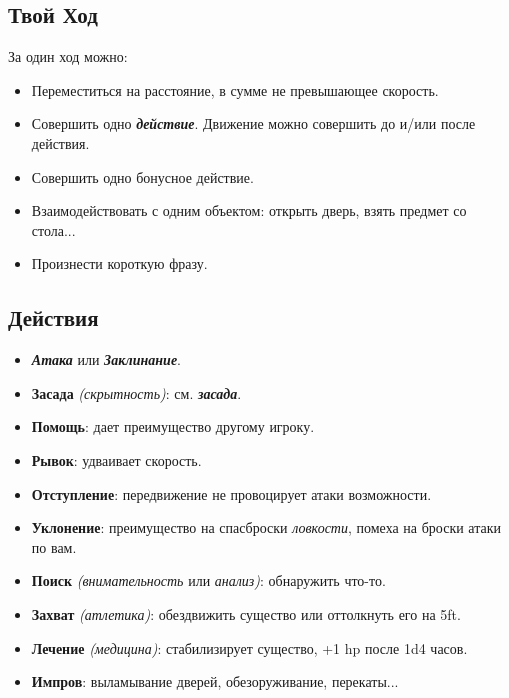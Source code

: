 \documentclass[a4paper,landscape,12pt]{book}
\begin{document}
\begin{multicols}{3}
\thispagestyle{empty}

\setlength{\parindent}{0.5em}
\setlength{\parskip}{1pt}

\section{Твой Ход}
За один ход можно:
\begin{itemize}
  \item Переместиться на расстояние, в сумме не превышающее скорость.
  \item Совершить одно \textbf{\textit{действие}}. Движение можно совершить до и/или после действия.
  \item Совершить одно бонусное действие.
  \item Взаимодействовать с одним объектом: открыть дверь, взять предмет со стола...
  \item Произнести короткую фразу.
\end{itemize}

\subsection{Действия}
\begin{itemize}
    \item \textbf{\textit{Атака}} или \textbf{\textit{Заклинание}}.
    \item \textbf{Засада} \textit{(скрытность)}: см. \textbf{\textit{засада}}.
    \item \textbf{Помощь}: дает преимущество другому игроку.
    \item \textbf{Рывок}: удваивает скорость.
    \item \textbf{Отступление}: передвижение не провоцирует атаки возможности.
    \item \textbf{Уклонение}: преимущество на спасброски \textit{ловкости}, помеха на броски атаки по вам.
    \item \textbf{Поиск} \textit{(внимательность} или \textit{анализ)}: обнаружить что-то.
    \item \textbf{Захват} \textit{(атлетика)}: обездвижить существо или оттолкнуть его на 5ft.
    \item \textbf{Лечение} \textit{(медицина)}: стабилизирует существо, +1 hp после 1d4 часов.
    \item \textbf{Импров}: выламывание дверей, обезоруживание, перекаты...
\end{itemize}


\end{multicols}
\end{document}
